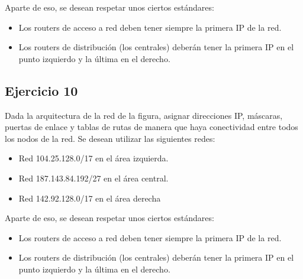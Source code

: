 \documentclass[letterpaper,10pt,spanish]{sphinxmanual}
\begin{document}
\begin{figure}[htbp]
\centering

\noindent{}
\end{figure}

\sphinxAtStartPar
Aparte de eso, se desean respetar unos ciertos estándares:
\begin{itemize}
\item {} 
\sphinxAtStartPar
Los routers de acceso a red deben tener siempre la primera IP de la red.

\item {} 
\sphinxAtStartPar
Los routers de distribución (los centrales) deberán tener la primera IP en el punto izquierdo y la última en el derecho.

\end{itemize}


\subsection{Ejercicio 10}
\label{\detokenize{t2_integracion_elementos/ejercicios_subredes_ipv4/ejercicios_dos_router:ejercicio-10}}
\sphinxAtStartPar
Dada la arquitectura de la red de la figura, asignar direcciones IP, máscaras, puertas de enlace y tablas de rutas de manera que haya conectividad entre todos
los nodos de la red. Se desean utilizar las siguientes redes:
\begin{itemize}
\item {} 
\sphinxAtStartPar
Red 104.25.128.0/17 en el área izquierda.

\item {} 
\sphinxAtStartPar
Red 187.143.84.192/27 en el área central.

\item {} 
\sphinxAtStartPar
Red 142.92.128.0/17 en el área derecha

\end{itemize}

\begin{figure}[htbp]
\centering

\noindent{}
\end{figure}

\sphinxAtStartPar
Aparte de eso, se desean respetar unos ciertos estándares:
\begin{itemize}
\item {} 
\sphinxAtStartPar
Los routers de acceso a red deben tener siempre la primera IP de la red.

\item {} 
\sphinxAtStartPar
Los routers de distribución (los centrales) deberán tener la primera IP en el punto izquierdo y la última en el derecho.

\end{itemize}
\end{document}
